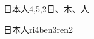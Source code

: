 \begin{entry}{日本人}{4,5,2}{⽇、⽊、⼈}
  \begin{phonetics}{日本人}{ri4ben3ren2}
  \end{phonetics}
\end{entry}
